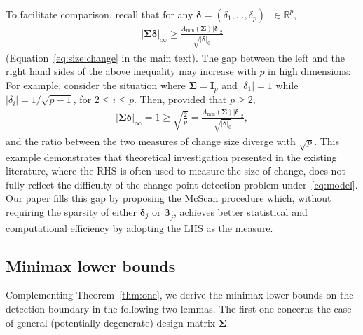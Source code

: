 \documentclass[11pt, a4paper]{article}
\newcommand{\mbf}{\mathbf}
\newcommand{\R}{\mathbb{R}}
\theoremstyle{definition}
\theoremstyle{definition}
\theoremstyle{definition}
\theoremstyle{definition}
\theoremstyle{definition}
\theoremstyle{remark}
\theoremstyle{definition}
\theoremstyle{definition}
\theoremstyle{definition}
\begin{document}
To facilitate comparison, recall that for any $\bm\delta = (\delta_1, \ldots, \delta_p)^\top \in \R^p$,
\begin{align*}
\vert \bm\Sigma \bm\delta \vert_\infty \ge \frac{\Lambda_{\min}(\bm\Sigma) \vert \bm\delta \vert_2}{\sqrt{\vert \bm\delta \vert_0}}
\end{align*}
(Equation~\eqref{eq:size:change} in the main text).
The gap between the left and the right hand sides of the above inequality may increase with $p$ in high dimensions: 
For example, consider the situation where $\bm\Sigma = \mbf I_p$ and $\vert \delta_{1} \vert = 1$ while $\vert \delta_{i} \vert = 1 / \sqrt{p - 1}$, for $2 \le i \le p$. 
Then, provided that $p \ge 2$,
\begin{align*}
\vert \bm\Sigma \bm\delta \vert_\infty = 1 \ge \sqrt{\frac{2}{p}} = \frac{\Lambda_{\min}(\bm\Sigma) \vert \bm\delta \vert_2}{\sqrt{\vert \bm\delta \vert_0}},
\end{align*}
and the ratio between the two measures of change size diverge with $\sqrt p$.
This example demonstrates that theoretical investigation presented in the existing literature, where the RHS is often used to measure the size of change, does not fully reflect the difficulty of the change point detection problem under~\eqref{eq:model}.
Our paper fills this gap by proposing the McScan procedure which, without requiring the sparsity of either $\bm\delta_j$ or $\bm\beta_j$, achieves better statistical and computational efficiency by adopting the LHS as the measure.

\subsection{Minimax lower bounds}
\label{ss:lb}

Complementing Theorem~\ref{thm:one}, we derive the minimax lower bounds on the detection boundary in the following two lemmas. The first one concerns the case of general (potentially degenerate) design matrix $\bm\Sigma$.  
\end{document}
